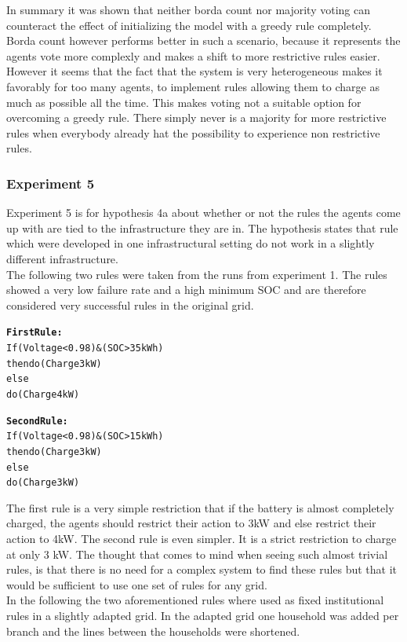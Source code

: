 \documentclass[a4paper]{article}
\begin{document}
In summary it was shown that neither borda count nor majority voting can counteract the effect of initializing 
the model with a greedy rule completely. 
Borda count however performs better in such a scenario, because it represents 
the agents vote more complexly and makes a shift to more restrictive rules easier.
However it seems that the fact that the system is very heterogeneous makes it favorably for too many agents, to 
implement rules allowing them to charge as much as possible all the time. This makes voting not a suitable option for 
overcoming a greedy rule. There simply never is a majority for more restrictive rules when everybody already hat the 
possibility to experience non restrictive rules. 


\clearpage
\subsubsection{Experiment 5}
Experiment 5 is for hypothesis 4a about whether or not the rules the agents come up with are tied to the infrastructure they are in. 
The hypothesis states that rule which were developed in one infrastructural setting do not work in a slightly different infrastructure.\\
The following  two rules were taken from the runs from experiment 1. The rules showed a very low failure rate and a high minimum SOC and 
are therefore considered very successful rules in the original grid.\\
\begin{alltt}
\textbf{First Rule:}
If (Voltage < 0.98) & (SOC > 35 kWh)
    then do (Charge 3 kW)
else 
    do  (Charge 4kW)

\textbf{Second Rule:}
If (Voltage < 0.98) & (SOC > 15 kWh)
    then do (Charge 3 kW)
else 
    do  (Charge 3kW)
\end{alltt}
The first rule is a very simple restriction that if the battery is almost completely charged, the agents should restrict their action to 
3kW and else restrict their action to 4kW. The second rule is even simpler. It is a strict restriction to charge at only 3 kW. The thought 
that comes to mind when seeing such almost trivial rules, is that there is no need for a complex system to find these rules but that it 
would be sufficient to use one set of rules for any grid.\\
In the following the two aforementioned rules where used as fixed institutional rules in a slightly adapted grid. In the adapted grid 
one household was added per branch and the lines between the households were shortened. \\
\end{document}
